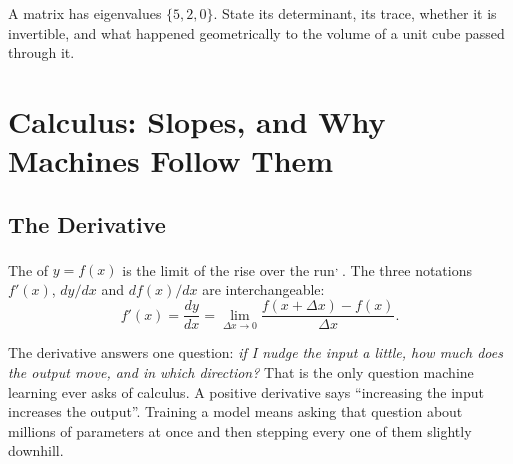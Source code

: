 \begin{checkpoint}
A matrix has eigenvalues $\{5, 2, 0\}$. State its determinant, its trace,
whether it is invertible, and what happened geometrically to the volume of a
unit cube passed through it.
\end{checkpoint}

\section{Calculus: Slopes, and Why Machines Follow Them}

\subsection{The Derivative}

The  of $y = f(x)$ is the limit of the rise over the
run\textsuperscript{\cite[][p.~89]{yangMathematicsCivilEngineers2018},
\cite[][p.~393]{bronsteinTaschenbuchMathematik2001}}. The three notations
$f'(x)$, $dy/dx$ and $df(x)/dx$ are interchangeable:
\begin{equation}
  f'(x) = \frac{dy}{dx} = \lim_{\Delta x\to0}
  \frac{f(x+\Delta x) - f(x)}{\Delta x}.
  \label{eq:math-derivative}
\end{equation}

\begin{plainlanguage}
The derivative answers one question: \emph{if I nudge the input a little, how
much does the output move, and in which direction?} That is the only question
machine learning ever asks of calculus. A positive derivative says ``increasing
the input increases the output''. Training a model means asking that question
about millions of parameters at once and then stepping every one of them
slightly downhill.
\end{plainlanguage}

